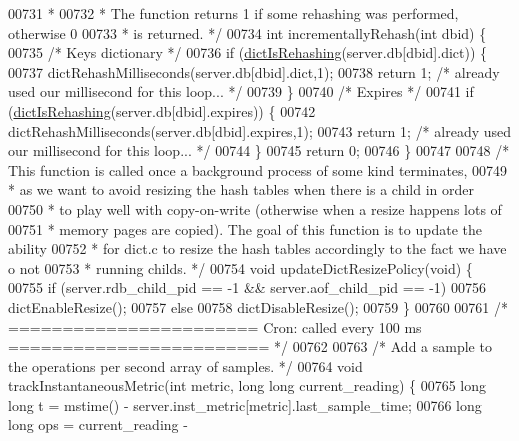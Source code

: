 \begin{DoxyCode}
{{{{{00731 \textcolor{comment}{ *}
00732 \textcolor{comment}{ * The function returns 1 if some rehashing was performed, otherwise 0}
00733 \textcolor{comment}{ * is returned. */}
00734 \textcolor{keywordtype}{int} incrementallyRehash(\textcolor{keywordtype}{int} dbid) \{
00735     \textcolor{comment}{/* Keys dictionary */}
00736     \textcolor{keywordflow}{if} (\hyperlink{dict_8h_aa6e4917a6a32fdf47180e03ed8969e02}{dictIsRehashing}(server.db[dbid].dict)) \{
00737         dictRehashMilliseconds(server.db[dbid].dict,1);
00738         \textcolor{keywordflow}{return} 1; \textcolor{comment}{/* already used our millisecond for this loop... */}
00739     \}
00740     \textcolor{comment}{/* Expires */}
00741     \textcolor{keywordflow}{if} (\hyperlink{dict_8h_aa6e4917a6a32fdf47180e03ed8969e02}{dictIsRehashing}(server.db[dbid].expires)) \{
00742         dictRehashMilliseconds(server.db[dbid].expires,1);
00743         \textcolor{keywordflow}{return} 1; \textcolor{comment}{/* already used our millisecond for this loop... */}
00744     \}
00745     \textcolor{keywordflow}{return} 0;
00746 \}
00747 
00748 \textcolor{comment}{/* This function is called once a background process of some kind terminates,}
00749 \textcolor{comment}{ * as we want to avoid resizing the hash tables when there is a child in order}
00750 \textcolor{comment}{ * to play well with copy-on-write (otherwise when a resize happens lots of}
00751 \textcolor{comment}{ * memory pages are copied). The goal of this function is to update the ability}
00752 \textcolor{comment}{ * for dict.c to resize the hash tables accordingly to the fact we have o not}
00753 \textcolor{comment}{ * running childs. */}
00754 \textcolor{keywordtype}{void} updateDictResizePolicy(\textcolor{keywordtype}{void}) \{
00755     \textcolor{keywordflow}{if} (server.rdb\_child\_pid == -1 && server.aof\_child\_pid == -1)
00756         dictEnableResize();
00757     \textcolor{keywordflow}{else}
00758         dictDisableResize();
00759 \}
00760 
00761 \textcolor{comment}{/* ======================= Cron: called every 100 ms ======================== */}
00762 
00763 \textcolor{comment}{/* Add a sample to the operations per second array of samples. */}
00764 \textcolor{keywordtype}{void} trackInstantaneousMetric(\textcolor{keywordtype}{int} metric, \textcolor{keywordtype}{long} \textcolor{keywordtype}{long} current\_reading) \{
00765     \textcolor{keywordtype}{long} \textcolor{keywordtype}{long} t = mstime() - server.inst\_metric[metric].last\_sample\_time;
00766     \textcolor{keywordtype}{long} \textcolor{keywordtype}{long} ops = current\_reading -
}}}}}
\end{DoxyCode}
